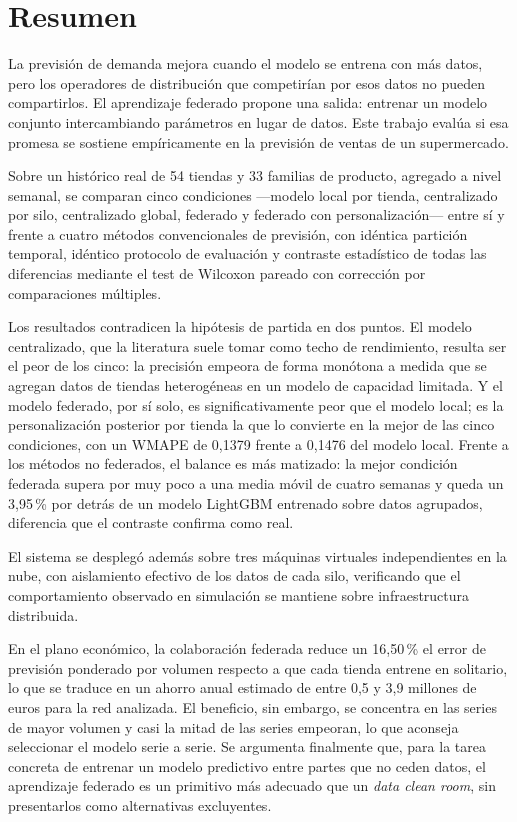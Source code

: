 \chapter*{Resumen}

La previsión de demanda mejora cuando el modelo se entrena con más datos, pero los operadores de
distribución que competirían por esos datos no pueden compartirlos. El aprendizaje federado propone
una salida: entrenar un modelo conjunto intercambiando parámetros en lugar de datos. Este trabajo
evalúa si esa promesa se sostiene empíricamente en la previsión de ventas de un supermercado.

Sobre un histórico real de 54 tiendas y 33 familias de producto, agregado a nivel semanal, se
comparan cinco condiciones —modelo local por tienda, centralizado por silo, centralizado global,
federado y federado con personalización— entre sí y frente a cuatro métodos convencionales de
previsión, con idéntica partición temporal, idéntico protocolo de evaluación y contraste estadístico
de todas las diferencias mediante el test de Wilcoxon pareado con corrección por comparaciones
múltiples.

Los resultados contradicen la hipótesis de partida en dos puntos. El modelo centralizado, que la
literatura suele tomar como techo de rendimiento, resulta ser el peor de los cinco: la precisión
empeora de forma monótona a medida que se agregan datos de tiendas heterogéneas en un modelo de
capacidad limitada. Y el modelo federado, por sí solo, es significativamente peor que el modelo
local; es la personalización posterior por tienda la que lo convierte en la mejor de las cinco
condiciones, con un WMAPE de 0,1379 frente a 0,1476 del modelo local. Frente a los métodos no
federados, el balance es más matizado: la mejor condición federada supera por muy poco a una media
móvil de cuatro semanas y queda un 3,95\,\% por detrás de un modelo LightGBM entrenado sobre datos
agrupados, diferencia que el contraste confirma como real.

El sistema se desplegó además sobre tres máquinas virtuales independientes en la nube, con
aislamiento efectivo de los datos de cada silo, verificando que el comportamiento observado en
simulación se mantiene sobre infraestructura distribuida.

En el plano económico, la colaboración federada reduce un 16,50\,\% el error de previsión ponderado
por volumen respecto a que cada tienda entrene en solitario, lo que se traduce en un ahorro anual
estimado de entre 0,5 y 3,9 millones de euros para la red analizada. El beneficio, sin embargo, se
concentra en las series de mayor volumen y casi la mitad de las series empeoran, lo que aconseja
seleccionar el modelo serie a serie. Se argumenta finalmente que, para la tarea concreta de
entrenar un modelo predictivo entre partes que no ceden datos, el aprendizaje federado es un
primitivo más adecuado que un \emph{data clean room}, sin presentarlos como alternativas
excluyentes.


